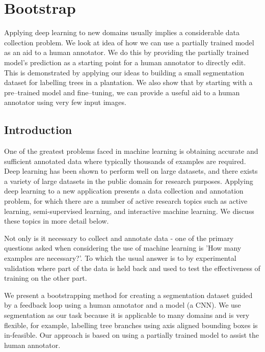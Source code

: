 


\chapter{Bootstrap}
\label{chap:boostrap} 
 
Applying deep learning to new domains usually implies a considerable data collection problem. We look at idea of how we can use a partially trained model as an aid to a human annotator. We do this by providing the partially trained model's prediction as a starting point for a human annotator to directly edit. This is demonstrated by applying our ideas to building a small segmentation dataset for labelling trees in a plantation. We also show that by starting with a pre--trained model and fine--tuning, we can provide a useful aid to a human annotator using very few input images.


\section {Introduction}


One of the greatest problems faced in machine learning is obtaining accurate and sufficient annotated data where typically thousands of examples are required. Deep learning has been shown to perform well on large datasets, and there exists a variety of large datasets in the public domain for research purposes. Applying deep learning to a new application presents a data collection and annotation problem, for which there are a number of active research topics such as active learning, semi-supervised learning, and interactive machine learning. We discuss these topics in more detail below.

Not only is it necessary to collect and annotate data - one of the primary questions asked when considering the use of machine learning is 'How many examples are necessary?'. To which the usual answer is to by experimental validation where part of the data is held back and used to test the effectiveness of training on the other part.

We present a bootstrapping method for creating a segmentation dataset guided by a feedback loop using a human annotator and a model (a \gls{CNN}). We use segmentation as our task because it is applicable to many domains and is very flexible, for example, labelling tree branches using axis aligned bounding boxes is in-feasible. Our approach is based on using a partially trained model to assist the human annotator.

